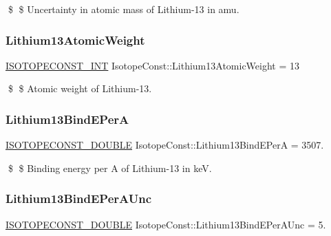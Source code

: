 \$ \$ Uncertainty in atomic mass of Lithium-\/13 in amu. \mbox{\label{group___isotope_const-_lithium-_li13_ga930a3c27c9282049658137adb67fc490}} 
\subsubsection{\texorpdfstring{Lithium13\+Atomic\+Weight}{Lithium13AtomicWeight}}
{\footnotesize\ttfamily \mbox{\hyperlink{group___isotope_const-_macros_ga5f18360b3e99483a35c32d789e62621c}{I\+S\+O\+T\+O\+P\+E\+C\+O\+N\+S\+T\+\_\+\+I\+NT}} Isotope\+Const\+::\+Lithium13\+Atomic\+Weight = 13}

\$ \$ Atomic weight of Lithium-\/13. \mbox{\label{group___isotope_const-_lithium-_li13_ga1e7003c058d9179452fc705e1928b414}} 
\subsubsection{\texorpdfstring{Lithium13\+Bind\+E\+PerA}{Lithium13BindEPerA}}
{\footnotesize\ttfamily \mbox{\hyperlink{group___isotope_const-_macros_ga8f45a7272ce02c0b4c65c44636ed719a}{I\+S\+O\+T\+O\+P\+E\+C\+O\+N\+S\+T\+\_\+\+D\+O\+U\+B\+LE}} Isotope\+Const\+::\+Lithium13\+Bind\+E\+PerA = 3507.}

\$ \$ Binding energy per A of Lithium-\/13 in keV. \mbox{\label{group___isotope_const-_lithium-_li13_ga532cfe35c656bf387f14983db189ba62}} 
\subsubsection{\texorpdfstring{Lithium13\+Bind\+E\+Per\+A\+Unc}{Lithium13BindEPerAUnc}}
{\footnotesize\ttfamily \mbox{\hyperlink{group___isotope_const-_macros_ga8f45a7272ce02c0b4c65c44636ed719a}{I\+S\+O\+T\+O\+P\+E\+C\+O\+N\+S\+T\+\_\+\+D\+O\+U\+B\+LE}} Isotope\+Const\+::\+Lithium13\+Bind\+E\+Per\+A\+Unc = 5.}

